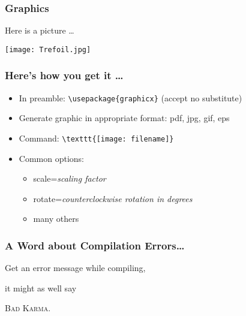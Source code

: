 \documentclass{beamer}
\begin{document}
\begin{frame}\frametitle{Graphics}

Here is a picture \ldots 

\begin{center}
\texttt{[image: Trefoil.jpg]}
\end{center}


\end{frame}

\begin{frame}[fragile]\frametitle{Here's how you get it \ldots}

\begin{itemize}
  \item In preamble: \verb#\usepackage{graphicx}# (accept no substitute) \vfill
  \item Generate graphic in appropriate format: pdf, jpg, gif, eps\vfill
  \item Command: \verb#\texttt{[image: filename]}#\vfill
  \item Common options:\vfill
  \begin{itemize}
    \item scale=\textsl{scaling factor}\vfill
    \item rotate=\textsl{counterclockwise rotation in degrees}\vfill
    \item many others\vfill
  \end{itemize}
\end{itemize}
\end{frame}


\begin{frame}\frametitle{A Word about Compilation Errors\ldots}

\vfill

Get an error message while compiling, 
\pause

\vfill

it might as well say 

\pause

\vfill
\textsc{Bad Karma}.

\vfill

\end{frame}
\end{document}
